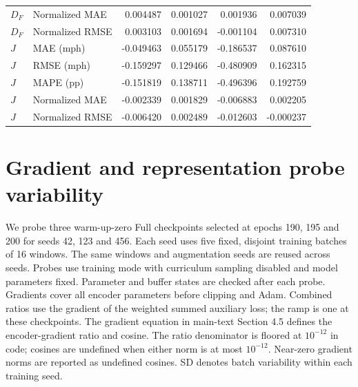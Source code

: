\documentclass[a4paper,10pt]{article}
\begin{document}
\begin{longtable}{llrrrr}
$D_F$ & Normalized MAE & 0.004487 & 0.001027 & 0.001936 & 0.007039 \\

$D_F$ & Normalized RMSE & 0.003103 & 0.001694 & -0.001104 & 0.007310 \\

$J$ & MAE (mph) & -0.049463 & 0.055179 & -0.186537 & 0.087610 \\

$J$ & RMSE (mph) & -0.159297 & 0.129466 & -0.480909 & 0.162315 \\

$J$ & MAPE (pp) & -0.151819 & 0.138711 & -0.496396 & 0.192759 \\

$J$ & Normalized MAE & -0.002339 & 0.001829 & -0.006883 & 0.002205 \\

$J$ & Normalized RMSE & -0.006420 & 0.002489 & -0.012603 & -0.000237 \\

\bottomrule
\end{longtable}\endgroup

\section{Gradient and representation probe variability}
We probe three warm-up-zero Full checkpoints selected at epochs 190, 195 and 200 for seeds 42, 123 and 456. Each seed uses five fixed, disjoint training batches of 16 windows. The same windows and augmentation seeds are reused across seeds. Probes use training mode with curriculum sampling disabled and model parameters fixed. Parameter and buffer states are checked after each probe. Gradients cover all encoder parameters before clipping and Adam. Combined ratios use the gradient of the weighted summed auxiliary loss; the ramp is one at these checkpoints. The gradient equation in main-text Section 4.5 defines the encoder-gradient ratio and cosine. The ratio denominator is floored at $10^{-12}$ in code; cosines are undefined when either norm is at most $10^{-12}$. Near-zero gradient norms are reported as undefined cosines. SD denotes batch variability within each training seed.
\end{document}
